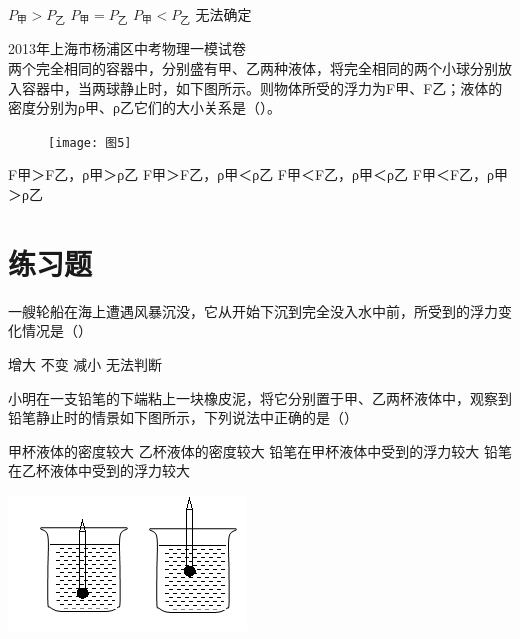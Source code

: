 \documentclass[12pt,twoside]{exam}
\begin{document}
\begin{knowledge}
\begin{questions}
\begin{multicols}{2}
\begin{oneparchoices}
\choice $P_\textrm{甲}>P_\textrm{乙}$ 
\choice $P_\textrm{甲}=P_\textrm{乙}$  
\choice $P_\textrm{甲}<P_\textrm{乙}$  \hspace{33pt}
\choice 无法确定
\end{oneparchoices}

\end{multicols}

\question
2013年上海市杨浦区中考物理一模试卷\\
两个完全相同的容器中，分别盛有甲、乙两种液体，将完全相同的两个小球分别放入容器中，当两球静止时，如下图所示。则物体所受的浮力为F甲、F乙；液体的密度分别为ρ甲、ρ乙它们的大小关系是（\answerline*[C]）。
 \begin{multicols}{2}
\begin{figure}[H]
\centering
\texttt{[image: 图5]}
\end{figure}
\columnbreak

\begin{choices}
\choice  F甲＞F乙，ρ甲＞ρ乙
\choice 	 F甲＞F乙，ρ甲＜ρ乙
\choice 	 F甲＜F乙，ρ甲＜ρ乙
\choice 	 F甲＜F乙，ρ甲＞ρ乙
\end{choices}
\end{multicols}

\end{questions}



\newpage
\section{练习题}
\begin{questions}
\question
一艘轮船在海上遭遇风暴沉没，它从开始下沉到完全没入水中前，所受到的浮力变化情况是（\answerline*[A]）
\begin{choices}
\begin{multicols}{4}
\choice 增大
\choice 不变
\choice 减小
\choice 无法判断
\end{multicols}
\end{choices}


\question
小明在一支铅笔的下端粘上一块橡皮泥，将它分别置于甲、乙两杯液体中，观察到铅笔静止时的情景如下图所示，下列说法中正确的是（\answerline*[B]）
\begin{multicols}{2}
\begin{choices}
\choice 甲杯液体的密度较大
\choice 乙杯液体的密度较大
\choice 铅笔在甲杯液体中受到的浮力较大
\choice 铅笔在乙杯液体中受到的浮力较大
\end{choices}
\columnbreak
\includegraphics[scale=1]{figures/图片12.png} 
\end{multicols}



\end{questions}
\end{knowledge}
\end{document}
